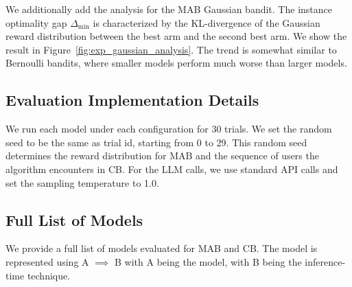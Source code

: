 We additionally add the analysis for the MAB Gaussian bandit. The instance optimality gap $\Delta_{\min}$ is characterized by the KL-divergence of the Gaussian reward distribution between the best arm and the second best arm. We show the result in Figure~\ref{fig:exp_gaussian_analysis}. The trend is somewhat similar to Bernoulli bandits, where smaller models perform much worse than larger models.


\subsection{Evaluation Implementation Details}

We run each model under each configuration for 30 trials. We set the random seed to be the same as trial id, starting from 0 to 29. This random seed determines the reward distribution for MAB and the sequence of users the algorithm encounters in CB. For the LLM calls, we use standard API calls and set the sampling temperature to 1.0. 

\subsection{Full List of Models}
\label{sec:app:model_full_list}

We provide a full list of models evaluated for MAB and CB. The model is represented using A $\implies$ B with A being the model, with B being the inference-time technique.

